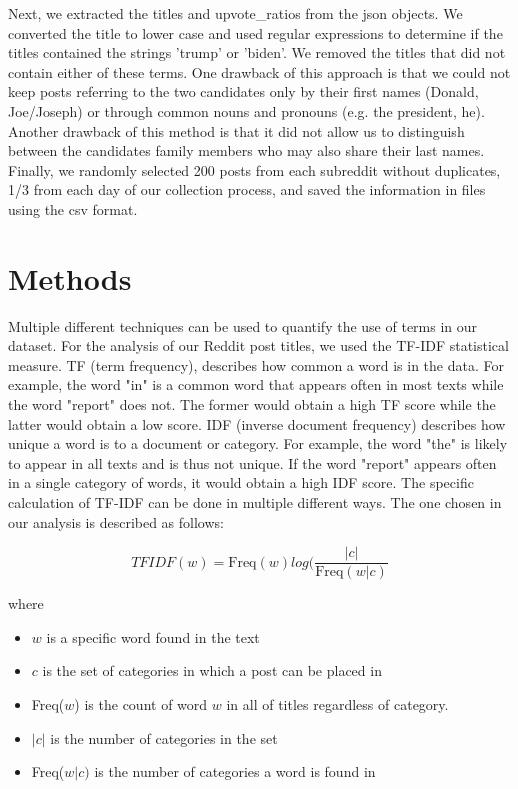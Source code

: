 \documentclass[11pt]{article}
\begin{document}
Next, we extracted the titles and upvote\_ratios from the json objects. We converted the title to lower case and used regular expressions to determine if the titles contained the strings 'trump' or 'biden'. We removed the titles that did not contain either of these terms. One drawback of this approach is that we could not keep posts referring to the two candidates only by their first names (Donald, Joe/Joseph) or through common nouns and pronouns (e.g. the president, he). Another drawback of this method is that it did not allow us to distinguish between the candidates family members who may also share their last names. Finally, we randomly selected 200 posts from each subreddit without duplicates, 1/3 from each day of our collection process, and saved the information in files using the csv format.

\section{Methods}

Multiple different techniques can be used to quantify the use of terms in our dataset. For the analysis of our Reddit post titles, we used the TF-IDF statistical measure. TF (term frequency), describes how common a word is in the data. For example, the word "in" is a common word that appears often in most texts while the word "report" does not. The former would obtain a high TF score while the latter would obtain a low score. IDF (inverse document frequency) describes how unique a word is to a document or category. For example, the word "the" is likely to appear in all texts and is thus not unique. If the word "report" appears often in a single category of words, it would obtain a high IDF score. The specific calculation of TF-IDF can be done in multiple different ways. The one chosen in our analysis is described as follows:

$$TFIDF(w) = \text{Freq}(w)log(\dfrac{|c|}{\text{Freq}(w|c)}$$

where 

\begin{itemize}
    \item $w$ is a specific word found in the text
    \item $c$ is the set of categories in which a post can be placed in
    \item Freq($w$) is the count of word $w$ in all of titles regardless of category.
    \item $|c|$ is the number of categories in the set
    \item Freq($w|c)$ is the number of categories a word is found in
\end{itemize}
\end{document}
